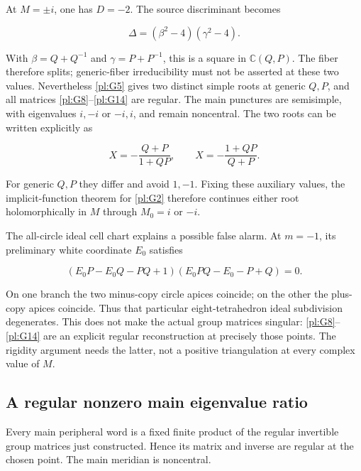 At \(M=\pm i\), one has \(D=-2\). The source discriminant
becomes

\begin{equation}\label{pl:G15}
\Delta=(\beta^2-4)(\gamma^2-4).
\end{equation}

With \(\beta=Q+Q^{-1}\) and \(\gamma=P+P^{-1}\),
this is a square in \(\mathbb C(Q,P)\). The fiber therefore
splits; generic-fiber irreducibility must not be asserted
at these two values. Nevertheless \eqref{pl:G5} gives two distinct
simple roots at generic \(Q,P\), and all matrices \eqref{pl:G8}--\eqref{pl:G14}
are regular. The main punctures are semisimple, with
eigenvalues \(i,-i\) or \(-i,i\), and remain noncentral.
The two roots can be written explicitly as

\begin{equation}\label{pl:G15a}
X=-\frac{Q+P}{1+QP},\qquad
             X=-\frac{1+QP}{Q+P}.
\end{equation}

For generic \(Q,P\) they differ and avoid \(1,-1\).
Fixing these auxiliary values, the implicit-function theorem
for \eqref{pl:G2} therefore continues either root holomorphically in
\(M\) through \(M_0=i\) or \(-i\).

The all-circle ideal cell chart explains a possible false alarm.
At \(m=-1\), its preliminary white coordinate \(E_0\)
satisfies

\begin{equation}\label{pl:G16}
(E_0P-E_0Q-PQ+1)(E_0PQ-E_0-P+Q)=0.
\end{equation}

On one branch the two minus-copy circle apices coincide; on
the other the plus-copy apices coincide. Thus that particular
eight-tetrahedron ideal subdivision degenerates. This does
not make the actual group matrices singular: \eqref{pl:G8}--\eqref{pl:G14} are
an explicit regular reconstruction at precisely those points.
The rigidity argument needs the latter, not a positive
triangulation at every complex value of \(M\).

\subsection{A regular nonzero main eigenvalue ratio}\label{pl:a-regular-nonzero-main-eigenvalue-ratio}

Every main peripheral word is a fixed finite product of the
regular invertible group matrices just constructed. Hence its
matrix and inverse are regular at the chosen point.
The main meridian is noncentral.

